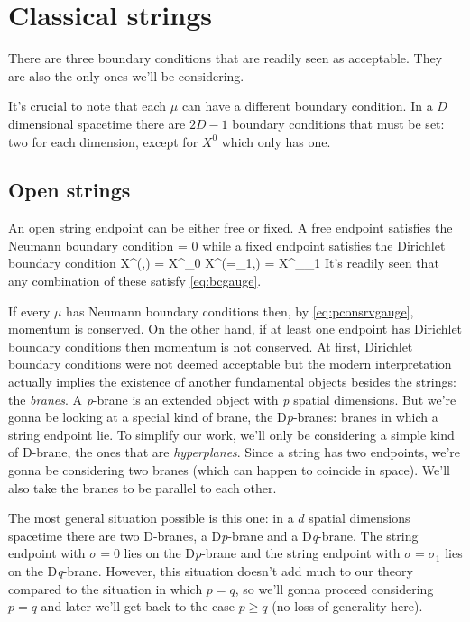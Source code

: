 \documentclass[oneside, 12pt]{book}
\begin{document}
\pagestyle{mypage2} \normalfont


\chapter{Classical strings}

There are three boundary conditions that are readily seen as acceptable. They are also the only ones we'll be considering.\par

It's crucial to note that each \(\mu\) can have a different boundary condition. In a \(D\) dimensional spacetime there are \(2D-1\) boundary conditions that must be set: two for each dimension, except for \(X^0\) which only has one.\par

\section{Open strings}

An open string endpoint can be either free or fixed. A free endpoint satisfies the Neumann boundary condition
\beq[eq:neumannbc]  = 0  \eeq
while a fixed endpoint satisfies the Dirichlet boundary condition
\beq[] X^{\mu}(,\tau) = X^{\mu}_0  X^{\mu}(\sigma=\sigma_1,\tau) = X^{\mu}_{\sigma_1} \eeq
It's readily seen that any combination of these satisfy \eqref{eq:bcgauge}.\par

If every \(\mu\) has Neumann boundary conditions then, by \eqref{eq:pconsrvgauge}, momentum is conserved. On the other hand, if at least one endpoint has Dirichlet boundary conditions then momentum is not conserved. At first, Dirichlet boundary conditions were not deemed acceptable but the modern interpretation actually implies the existence of another fundamental objects besides the strings: the \textit{branes}. A \textit{p}-brane is an extended object with \textit{p} spatial dimensions. But we're gonna be looking at a special kind of brane, the D\textit{p}-branes: branes in which a string endpoint lie. To simplify our work, we'll only be considering a simple kind of D-brane, the ones that are \textit{hyperplanes}. Since a string has two endpoints, we're gonna be considering two branes (which can happen to coincide in space). We'll also take the branes to be parallel to each other.\par

The most general situation possible is this one: in a \(d\) spatial dimensions spacetime there are two D-branes, a D\textit{p}-brane and a D\textit{q}-brane. The string endpoint with \(\sigma=0\) lies on the D\textit{p}-brane and the string endpoint with \(\sigma=\sigma_1\) lies on the D\textit{q}-brane. However, this situation doesn't add much to our theory compared to the situation in which \(p=q\), so we'll gonna proceed considering \(p=q\) and later we'll get back to the case \(p\geq q\) (no loss of generality here).\par
\end{document}
